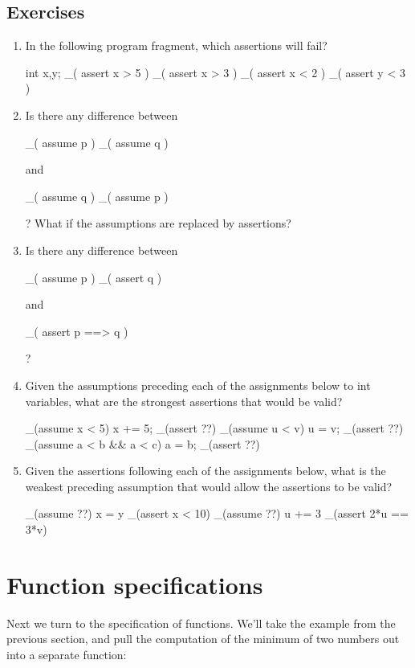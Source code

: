 \subsection*{Exercises}
\begin{enumerate}
\item
In the following program fragment, which assertions will fail?
\begin{VCC}
int x,y; 
_( assert x > 5 ) 
_( assert x > 3 ) 
_( assert x < 2 ) 
_( assert y < 3 )
\end{VCC}
\item
Is there any difference between 
\begin{VCC}
_( assume p ) _( assume q  )
\end{VCC}
and 
\begin{VCC}
_( assume q ) _( assume p )
\end{VCC}
? What if the assumptions are replaced by assertions?
\item
Is there any difference between
\begin{VCC}
_( assume p ) _( assert q )
\end{VCC}
and 
\begin{VCC}
_( assert p ==> q )
\end{VCC}
? 
\item
{}
Given the assumptions preceding each of the assignments below to int
variables, what are the strongest assertions that would be valid?
\begin{VCC}
_(assume x < 5) x += 5; _(assert ??)
_(assume u < v) u = v;  _(assert ??)
_(assume a < b && a < c) a = b;  _(assert ??)
\end{VCC}
\item
Given the assertions following each of the assignments below, what is 
the weakest preceding assumption that would allow the assertions to be
valid?
\begin{VCC}
_(assume ??) x = y _(assert x < 10)
_(assume ??) u += 3 _(assert 2*u == 3*v)
\end{VCC}
\end{enumerate}

\section{Function specifications}
\label{sect:functions}

Next we turn to the specification of functions. We'll take the example
from the previous section, and pull the computation of the minimum of
two numbers out into a separate function:

